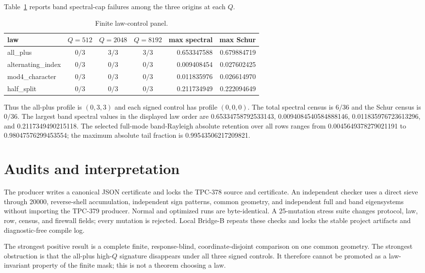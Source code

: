 \documentclass[10pt]{article}
\begin{document}
Table~\ref{tab:law} reports band spectral-cap failures among the three
origins at each $Q$.

\begin{table}[ht]
\centering
\caption{Finite law-control panel.}
\label{tab:law}
\scriptsize
\begin{tabular}{l c c c r r}
\toprule
law & $Q=512$ & $Q=2048$ & $Q=8192$ & max spectral & max Schur\\
\midrule
all\_plus & $0/3$ & $3/3$ & $3/3$ & 0.653347588 & 0.679884719\\
alternating\_index & $0/3$ & $0/3$ & $0/3$ & 0.009408454 & 0.027602425\\
mod4\_character & $0/3$ & $0/3$ & $0/3$ & 0.011835976 & 0.026614970\\
half\_split & $0/3$ & $0/3$ & $0/3$ & 0.211734949 & 0.222094649\\
\bottomrule
\end{tabular}
\end{table}

Thus the all-plus profile is $(0,3,3)$ and each signed control has profile
$(0,0,0)$. The total spectral census is $6/36$ and the Schur census is
$0/36$. The largest band spectral values in the displayed law order are
0.65334758792533143, 0.0094084540584888146, 0.011835976723613296, and
0.2117349490215118. The selected full-mode band-Rayleigh absolute retention
over all rows ranges from 0.0045649378279021191 to 0.98047576299453554;
the maximum absolute tail fraction is 0.99543506217209821.

\section{Audits and interpretation}

The producer writes a canonical JSON certificate and locks the TPC-378
source and certificate. An independent checker uses a direct sieve through
20000, reverse-shell accumulation, independent sign patterns, common
geometry, and independent full and band eigensystems without importing the
TPC-379 producer. Normal and optimized runs are byte-identical. A
25-mutation stress suite changes protocol, law, row, census, and firewall
fields; every mutation is rejected. Local Bridge-B repeats these checks and
locks the stable project artifacts and diagnostic-free compile log.

The strongest positive result is a complete finite, response-blind,
coordinate-disjoint comparison on one common geometry. The strongest
obstruction is that the all-plus high-$Q$ signature disappears under all
three signed controls. It therefore cannot be promoted as a law-invariant
property of the finite mask; this is not a theorem choosing a law.
\end{document}
